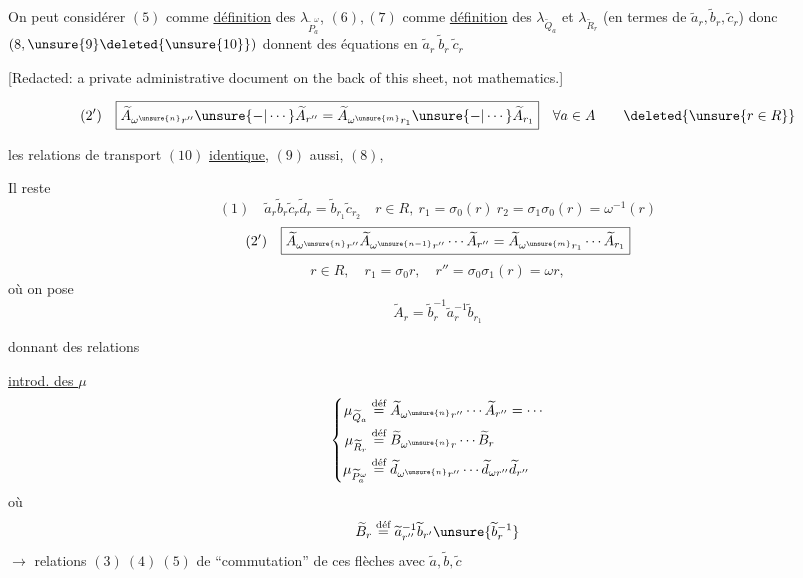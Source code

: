 On peut considérer $(5)$ comme \uline{définition} des $\lambda_{\widetilde P_a^\omega}$, $(6),(7)$ comme \uline{définition} des $\lambda_{\widetilde Q_a}$ et $\lambda_{\widetilde R_r}$ (en termes de $\widetilde a_r,\widetilde b_r,\widetilde c_r$) donc $(8,\unsure{9}\deleted{\unsure{10}})$ donnent des équations en $\widetilde a_r\ \widetilde b_r\ \widetilde c_r$

[Redacted: a private administrative document on the back of this sheet, not mathematics.]

\[
(2')\quad\boxed{\widetilde A_{\omega^{\unsure{n}}r''}\unsure{-|\cdots}\widetilde A_{r''}
=\widetilde A_{\omega^{\unsure{m}}r_1}\unsure{-|\cdots}\widetilde A_{r_1}}
\quad\forall a\in A\qquad\deleted{\unsure{r\in R}}
\]

les relations de transport $(10)$ \uline{identique}, $(9)$ aussi, $(8)$, 

Il reste
\[
(1)\quad\boxed{\widetilde a_r\widetilde b_r\widetilde c_r\widetilde d_r
=\widetilde b_{r_1}\widetilde c_{r_2}}
\quad r\in R,\ r_1=\sigma_0(r)\ r_2=\sigma_1\sigma_0(r)=\omega^{-1}(r)
\]
\[
(2')\quad\boxed{\widetilde A_{\omega^{\unsure{n}}r''}\widetilde A_{\omega^{\unsure{n-1}}r''}\cdots\widetilde A_{r''}
=\widetilde A_{\omega^{\unsure{m}}r_1}\cdots\widetilde A_{r_1}}
\]
\[
r\in R,\quad r_1=\sigma_0r,\quad r''=\sigma_0\sigma_1(r)=\omega r,
\]
où on pose
\[
\widetilde A_r=\widetilde b_r^{-1}\widetilde a_r^{-1}\widetilde b_{r_1}
\]

donnant des relations

\uline{introd. des $\mu$}
\[
\left\{\begin{aligned}
\mu_{\widetilde Q_a}&\overset{\text{déf}}=\widetilde A_{\omega^{\unsure{n}}r''}\cdots\widetilde A_{r''}=\cdots\\
\mu_{\widetilde R_r}&\overset{\text{déf}}=\widetilde B_{\omega^{\unsure{n}}r}\cdots\widetilde B_r\\
\mu_{\widetilde P_a^\omega}&\overset{\text{déf}}=\widetilde d_{\omega^{\unsure{n}}r''}\cdots\widetilde d_{\omega r''}\widetilde d_{r''}
\end{aligned}\right.
\]
où
\[
\widetilde B_r\overset{\text{déf}}=\widetilde a_{r''}^{-1}\widetilde b_{r'}\unsure{\widetilde b_r^{-1}}
\]
$\longrightarrow$ relations $(3)\ (4)\ (5)$ de ``commutation'' de ces flèches avec $\widetilde a,\widetilde b,\widetilde c$

